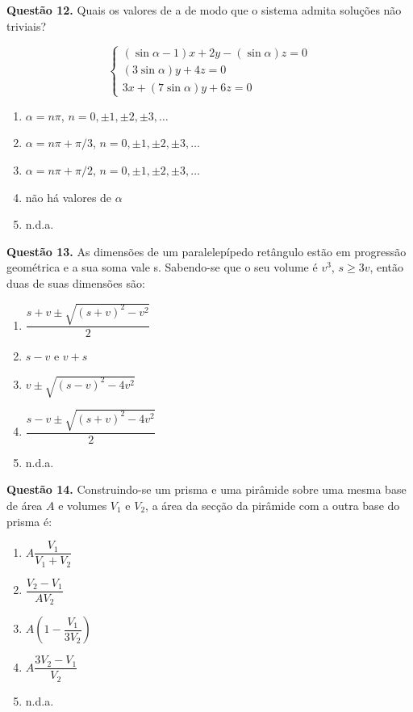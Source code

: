 \documentclass[11pt]{article}
\begin{document}
\textbf{Questão 12.} Quais  os  valores  de  a  de  modo  que  o  sistema  admita  soluções não triviais?

$$
\begin{cases}
(\sin{\alpha} - 1)x + 2y -(\sin{\alpha})z = 0\\
(3\sin{\alpha})y + 4z = 0 \\
3x + (7\sin{\alpha})y + 6z = 0
\end{cases}
$$

\begin{enumerate}[\bf A (\quad)]
    \item $\alpha = n\pi$, $n = 0,\pm 1,\pm 2, \pm 3, \dots$
    \item $\alpha = n\pi + \pi/3$, $n = 0,\pm 1,\pm 2, \pm 3, \dots$
    \item $\alpha = n\pi + \pi/2$, $n = 0,\pm 1,\pm 2, \pm 3, \dots$
    \item não há valores de $\alpha$
    \item n.d.a.
\end{enumerate}


\textbf{Questão 13.} As  dimensões  de  um  paralelepípedo  retângulo  estão  em progressão geométrica e a sua soma vale s. Sabendo-se  que  o  seu  volume  é  $v^3$,  $s \geq 3v$,  então  duas  de  suas  dimensões são:

\begin{enumerate}[\bf A (\quad)]
    \item $\dfrac{s + v \pm \sqrt{(s + v)^2 - v^2}}{2}$
    \item $s - v$ e $v + s$
    \item $v \pm \sqrt{(s - v)^2 - 4v^2}$
    \item $\dfrac{s - v \pm \sqrt{(s + v)^2 - 4v^2}}{2}$
    \item n.d.a.
\end{enumerate}


\textbf{Questão 14.} Construindo-se um prisma e uma pirâmide sobre uma mesma  base  de  área  $A$  e  volumes  $V_1$  e  $V_2$,  a  área  da  secção da pirâmide com a outra base do prisma é: 

\begin{enumerate}[\bf A (\quad)]
    \item $A\dfrac{V_1}{V_1 + V_2}$
    \item $\dfrac{V_2 - V_1}{AV_2}$
    \item $A \left( 1 - \dfrac{V_1}{3V_2} \right)$
    \item $A \dfrac{3V_2 - V_1}{V_2}$
    \item n.d.a.
\end{enumerate}
\end{document}
